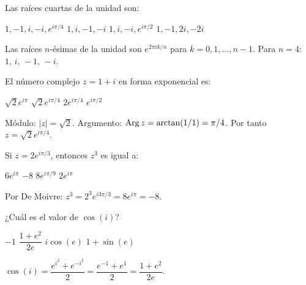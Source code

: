 \begin{questions}
  \question Las raíces cuartas de la unidad son:

  \begin{choices}
    \choice $1, -1, i, -i, e^{i\pi/4}$
    \CorrectChoice $1, i, -1, -i$
    \choice $1, i, -i, e^{i\pi/2}$
    \choice $1, -1, 2i, -2i$
  \end{choices}
  \begin{solution}
    Las raíces $n$-ésimas de la unidad son $e^{2\pi ik/n}$ para $k = 0, 1, \ldots, n-1$. Para $n = 4$: $1,\, i,\, -1,\, -i$.
  \end{solution}

  \question El número complejo $z = 1 + i$ en forma exponencial es:

  \begin{choices}
    \choice $\sqrt{2}e^{i\pi}$
    \CorrectChoice $\sqrt{2}e^{i\pi/4}$
    \choice $2e^{i\pi/4}$
    \choice $e^{i\pi/2}$
  \end{choices}
  \begin{solution}
    Módulo: $|z| = \sqrt{2}$. Argumento: $\operatorname{Arg} z = \arctan(1/1) = \pi/4$. Por tanto $z = \sqrt{2}e^{i\pi/4}$.
  \end{solution}

  \question Si $z = 2e^{i\pi/3}$, entonces $z^3$ es igual a:

  \begin{choices}
    \choice $6e^{i\pi}$
    \CorrectChoice $-8$
    \choice $8e^{i\pi/9}$
    \choice $2e^{i\pi}$
  \end{choices}
  \begin{solution}
    Por De Moivre: $z^3 = 2^3 e^{i3\pi/3} = 8e^{i\pi} = -8$.
  \end{solution}

  \question ¿Cuál es el valor de $\cos(i)$?

  \begin{choices}
    \choice $-1$
    \CorrectChoice $\dfrac{1+e^2}{2e}$
    \choice $i\cos(e)$
    \choice $1+\sin(e)$
  \end{choices}
  \begin{solution}
    $\cos(i) = \dfrac{e^{i^2} + e^{-i^2}}{2} = \dfrac{e^{-1} + e^{1}}{2} = \dfrac{1+e^2}{2e}$.
  \end{solution}



\end{questions}
